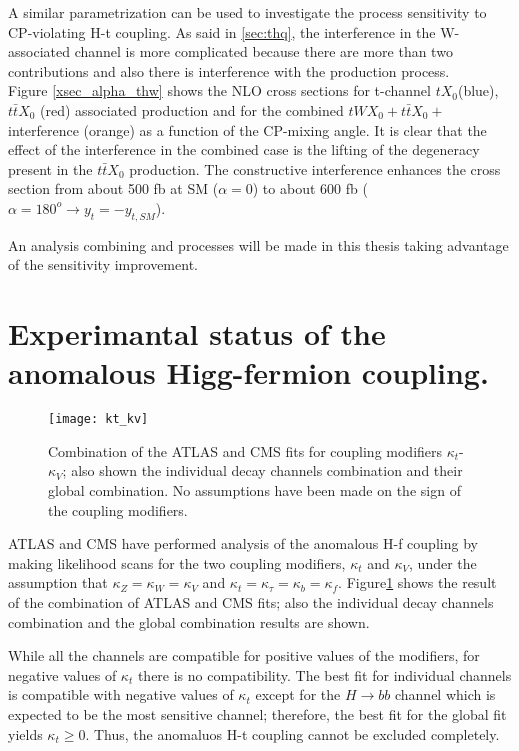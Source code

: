 \noindent A similar parametrization can be used to investigate the \tHW process sensitivity to CP-violating H-t coupling. As said in \ref{sec:thq}, the interference in the W-associated channel is more complicated because there are more than two contributions and also there is interference with the \ttH production process.\\

\noindent Figure \ref{xsec_alpha_thw} shows the NLO cross sections for t-channel $tX_0$(blue), $t\bar{t}X_0$ (red) associated production and for the combined  $tWX_0 + t\bar{t}X_0 +$ interference (orange) as a function of the CP-mixing angle. It is clear that the effect of the interference in the combined case is the lifting of the degeneracy present in the $t\bar{t}X_0$ production. The constructive interference enhances the cross section from about 500 fb at SM ($\alpha=0$) to about 600 fb ($\alpha=180^o \to y_t=-y_{t,SM}$).  

\noindent An analysis combining \tHq and \tHW processes will be made in this thesis taking advantage of the sensitivity improvement.

\section{Experimantal status of the anomalous Higg-fermion coupling.}

\begin{figure}[h!]
\centering
\texttt{[image: kt\_kv]}
\caption[Two dimentional $\kappa_t$-$\kappa_V$ plot of the coupling modifiers. ATLAS and CMS combination.]{Combination of the  ATLAS and CMS fits for coupling modifiers $\kappa_t$-$\kappa_V$; also shown the individual decay channels combination and their global combination. No assumptions have been made on the sign of the coupling modifiers\cite{comb_ht_couplings}.} 
\label{fig:kt_kv}
\end{figure}
 
\noindent ATLAS and CMS have performed analysis of the anomalous H-f coupling by making likelihood scans for the two coupling modifiers, $\kappa_t$ and $\kappa_V$, under the assumption that $\kappa_Z=\kappa_W=\kappa_V$ and $\kappa_t=\kappa_\tau=\kappa_b=\kappa_f$. Figure\ref{fig:kt_kv} shows the result of the combination of ATLAS and CMS fits; also the individual decay channels combination and the global combination results are shown.

\noindent While all the channels are compatible for positive values of the modifiers, for negative values of $\kappa_t$ there is no compatibility. The best fit for individual channels is compatible with negative values of $\kappa_t$ except for the $H\to bb$ channel which is expected to be the most sensitive channel; therefore, the best fit for the global fit yields $\kappa_t\geq0$. Thus, the anomaluos H-t coupling cannot be excluded completely. 
